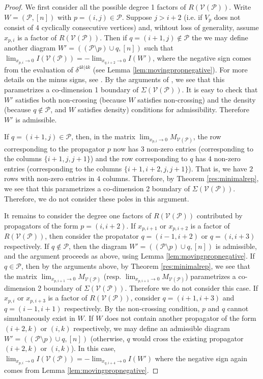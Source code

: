 \documentclass[11pt]{article}
\newcommand{\cP}{\mathcal{P}}
\newcommand{\cV}{\mathcal{V}}
\newcommand{\VP}{\cV(\cP)}
\theoremstyle{remark}
\theoremstyle{definition}
\begin{document}
\begin{proof}

We first consider all the possible degree 1 factors of $R(\VP)$. Write $W = (\cP, [n])$ with $p= (i,j)  \in \cP$. Suppose $j > i+2$ (i.e. if $V_p$ does not consist of $4$ cyclically consecutive vertices) and, wihtout loss of generality, assume $x_{p, i}$ is a factor of $R(\VP)$. Then if $q = (i+1, j) \not \in \cP$ the we may define another diagram $W' = ((\cP \setminus p) \cup q, [n])$ such that $\lim_{x_{p, i} \rightarrow 0} I(\VP) = -\lim_{x_{q, i+2} \rightarrow 0} I(W')$, where the negative sign comes from the evaluation of $\delta^{4k|4k}$ (see Lemma \ref{lem:movingpropnegative}). For more details on the minus signs, see \cite{casestudy, HeslopSteward, correlahedron}. By the arguments of \cite{basisshapeloci}, we see that this parametrizes a co-dimension 1 boundary of $\Sigma(\VP)$. It is easy to check that $W'$ satisfies both non-crossing (because $W$ satisfies non-crossing) and the density (because $q \not \in \cP$, and $W$ satisfies density) conditions for admissibility. Therefore $W'$ is admissible. 

If $q = (i+1, j) \in \cP$, then, in the matrix $\lim_{x_{p, i} \rightarrow 0}M_{\VP}$, the row corresponding to the propagator $p$ now has 3 non-zero entries (corresponding to the columns $\{i+1, j, j+1\}$) and the row corresponding to $q$ has $4$ non-zero entries (corresponding to the columns $\{i+1, i+2, j, j+1\}$). That is, we have $2$ rows with non-zero entries in $4$ columns. Therefore, by Theorem \ref{res:minimalrep}, we see that this parametrizes a co-dimension 2 boundary of $\Sigma(\VP)$. Therefore, we do not consider these poles in this argument. 

It remains to consider the degree one factors of $R(\VP)$ contributed by propagators of the form $p = (i, i+2)$. If $x_{p, i+1}$ or $x_{p, i+2}$ is a factor of $R(\VP)$, then consider the propatator $q = (i-1, i+2)$ or $q = (i, i+3)$ respectively. If $q \not \in \cP$, then the diagram $W' = ((\cP \setminus p)\cup q, [n])$ is admissible, and the argument proceeds as above, using Lemma \ref{lem:movingpropnegative}. If $q \in \cP$, then by the arguments above, by Theorem \ref{res:minimalrep}, we see that the matrix $\lim_{x_{p, i+1} \to 0} M_{\VP}$ (resp. $\lim_{x_{p, i+1} \to 0} M_{\VP}$) parametrizes a co-dimension 2 boundary of $\Sigma(\VP)$. Therefore we do not consider this case. If $x_{p, i}$ or $x_{p, i+3}$ is a factor of $R(\VP)$, consider $q = (i+1, i+3)$ and $q = (i-1, i+1)$ respectively. By the non-crossing condition, $p$ and $q$ cannot simultaneously exist in $W$. If $W$ does not contain another propagator of the form $(i+2, k)$ or $(i, k)$ respectively, we may define an admissible diagram $W' = ((\cP \setminus p)\cup q, [n])$ (otherwise, $q$ would cross the existing propagator $(i+2, k)$ or $(i, k)$).  In this case, $\lim_{x_{p, i} \rightarrow 0} I(\VP) = -\lim_{x_{q, i+4} \rightarrow 0} I(W')$ where the negative sign again comes from Lemma \ref{lem:movingpropnegative}.


\end{proof}
\end{document}

